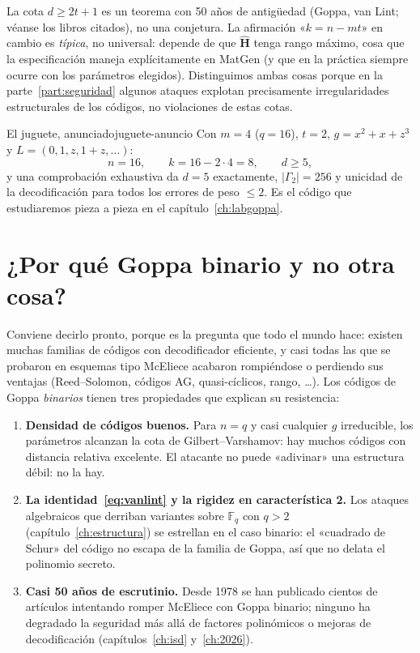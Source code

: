 \documentclass[11pt,a4paper,oneside]{report}
\newcommand{\GF}[1]{\mathbb{F}_{#1}}
\newcommand{\Hmat}{\mathbf{H}}          %
\begin{document}
\begin{rigor}
La cota $d\ge 2t+1$ es un teorema con 50 años de antigüedad (Goppa, van
Lint; véanse los libros citados), no una conjetura. La afirmación
«$k=n-mt$» en cambio es \emph{típica}, no universal: depende de que
$\hat{\Hmat}$ tenga rango máximo, cosa que la especificación maneja
explícitamente en \textsf{MatGen} (y que en la práctica siempre ocurre con
los parámetros elegidos). Distinguimos ambas cosas porque en la
parte~\ref{part:seguridad} algunos ataques explotan precisamente
irregularidades estructurales de los códigos, no violaciones de estas
cotas.
\end{rigor}

\begin{ejemplo}{El juguete, anunciado}{juguete-anuncio}
Con $m=4$ ($q=16$), $t=2$, $g=x^2+x+z^3$ y $L=(0,1,z,1+z,\dots)$:
\[
n=16,\qquad k=16-2\cdot4=8,\qquad d\ge 5,
\]
y una comprobación exhaustiva da $d=5$ exactamente, $|\Gamma_2|=256$ y
unicidad de la decodificación para todos los errores de peso $\le2$. Es el
código que estudiaremos pieza a pieza en el capítulo~\ref{ch:labgoppa}.
\end{ejemplo}

\section{¿Por qué Goppa binario y no otra cosa?}

Conviene decirlo pronto, porque es la pregunta que todo el mundo hace:
existen muchas familias de códigos con decodificador eficiente, y casi
todas las que se probaron en esquemas tipo McEliece acabaron
rompiéndose o perdiendo sus ventajas (Reed--Solomon, códigos AG,
quasi-cíclicos, rango, \ldots). Los códigos de Goppa \emph{binarios}
tienen tres propiedades que explican su resistencia:

\begin{enumerate}[leftmargin=1.6em,itemsep=3pt]
  \item \textbf{Densidad de códigos buenos.} Para $n=q$ y casi cualquier
        $g$ irreducible, los parámetros alcanzan la cota de
        Gilbert--Varshamov: hay muchos códigos con distancia relativa
        excelente. El atacante no puede «adivinar» una estructura débil:
        no la hay.
  \item \textbf{La identidad~\eqref{eq:vanlint} y la rigidez en
        característica 2.} Los ataques algebraicos que derriban variantes
        sobre $\GF{q}$ con $q>2$ (capítulo~\ref{ch:estructura}) se estrellan
        en el caso binario: el «cuadrado de Schur» del código no escapa de
        la familia de Goppa, así que no delata el polinomio secreto.
  \item \textbf{Casi 50 años de escrutinio.} Desde 1978 se han publicado
        cientos de artículos intentando romper McEliece con Goppa binario;
        ninguno ha degradado la seguridad más allá de factores polinómicos
        o mejoras de decodificación (capítulos~\ref{ch:isd}
        y~\ref{ch:2026}).
\end{enumerate}
\end{document}

